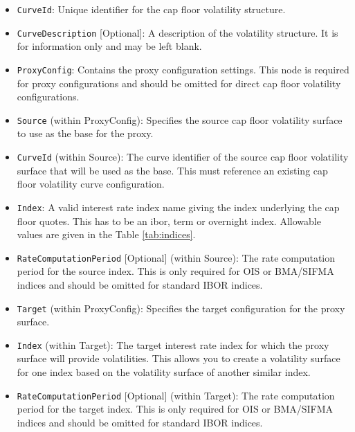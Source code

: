 \begin{itemize}
\item
\lstinline!CurveId!: Unique identifier for the cap floor volatility structure.

\item \lstinline!CurveDescription! [Optional]:
A description of the volatility structure. It is for information only and may be left blank.

\item \lstinline!ProxyConfig!:
Contains the proxy configuration settings. This node is required for proxy configurations and should be omitted for direct cap floor volatility configurations.

\item \lstinline!Source! (within ProxyConfig):
Specifies the source cap floor volatility surface to use as the base for the proxy.

\item \lstinline!CurveId! (within Source):
The curve identifier of the source cap floor volatility surface that will be used as the base. This must reference an existing cap floor volatility curve configuration.

\item \lstinline!Index!:
A valid interest rate index name giving the index underlying the cap floor quotes. This has to be an ibor, term or overnight index. Allowable values are given in the Table \ref{tab:indices}.

\item \lstinline!RateComputationPeriod! [Optional] (within Source):
The rate computation period for the source index. This is only required for OIS or BMA/SIFMA indices and should be omitted for standard IBOR indices.

\item \lstinline!Target! (within ProxyConfig):
Specifies the target configuration for the proxy surface.

\item \lstinline!Index! (within Target):
The target interest rate index for which the proxy surface will provide volatilities. This allows you to create a volatility surface for one index based on the volatility surface of another similar index.

\item \lstinline!RateComputationPeriod! [Optional] (within Target):
The rate computation period for the target index. This is only required for OIS or BMA/SIFMA indices and should be omitted for standard IBOR indices.


\end{itemize}
